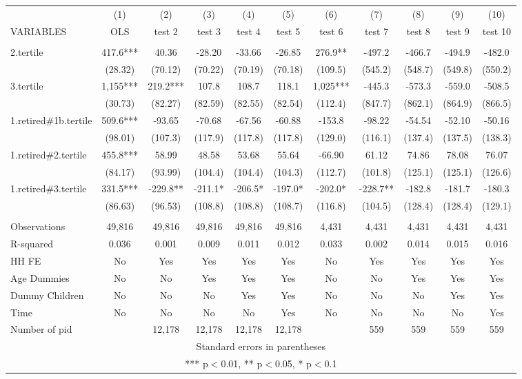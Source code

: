 \begin{tabular}{lcccccccccc} \hline
 & (1) & (2) & (3) & (4) & (5) & (6) & (7) & (8) & (9) & (10) \\
VARIABLES & OLS & test 2 & test 3 & test 4 & test 5 & test 6 & test 7 & test 8 & test 9 & test 10 \\ \hline
 &  &  &  &  &  &  &  &  &  &  \\
2.tertile & 417.6*** & 40.36 & -28.20 & -33.66 & -26.85 & 276.9** & -497.2 & -466.7 & -494.9 & -482.0 \\
 & (28.32) & (70.12) & (70.22) & (70.19) & (70.18) & (109.5) & (545.2) & (548.7) & (549.8) & (550.2) \\
3.tertile & 1,155*** & 219.2*** & 107.8 & 108.7 & 118.1 & 1,025*** & -445.3 & -573.3 & -559.0 & -508.5 \\
 & (30.73) & (82.27) & (82.59) & (82.55) & (82.54) & (112.4) & (847.7) & (862.1) & (864.9) & (866.5) \\
1.retired\#1b.tertile & 509.6*** & -93.65 & -70.68 & -67.56 & -60.88 & -153.8 & -98.22 & -54.54 & -52.10 & -50.16 \\
 & (98.01) & (107.3) & (117.9) & (117.8) & (117.8) & (129.0) & (116.1) & (137.4) & (137.5) & (138.3) \\
1.retired\#2.tertile & 455.8*** & 58.99 & 48.58 & 53.68 & 55.64 & -66.90 & 61.12 & 74.86 & 78.08 & 76.07 \\
 & (84.17) & (93.99) & (104.4) & (104.4) & (104.3) & (112.7) & (101.8) & (125.1) & (125.1) & (126.6) \\
1.retired\#3.tertile & 331.5*** & -229.8** & -211.1* & -206.5* & -197.0* & -202.0* & -228.7** & -182.8 & -181.7 & -180.3 \\
 & (86.63) & (96.53) & (108.8) & (108.8) & (108.7) & (116.8) & (104.5) & (128.4) & (128.4) & (129.1) \\
 &  &  &  &  &  &  &  &  &  &  \\
Observations & 49,816 & 49,816 & 49,816 & 49,816 & 49,816 & 4,431 & 4,431 & 4,431 & 4,431 & 4,431 \\
R-squared & 0.036 & 0.001 & 0.009 & 0.011 & 0.012 & 0.033 & 0.002 & 0.014 & 0.015 & 0.016 \\
HH FE & No & Yes & Yes & Yes & Yes & No & Yes & Yes & Yes & Yes \\
Age Dummies & No & No & Yes & Yes & Yes & No & No & Yes & Yes & Yes \\
Dummy Children & No & No & No & Yes & Yes & No & No & No & Yes & Yes \\
Time & No & No & No & No & Yes & No & No & No & No & Yes \\
 Number of pid &  & 12,178 & 12,178 & 12,178 & 12,178 &  & 559 & 559 & 559 & 559 \\ \hline
\multicolumn{11}{c}{ Standard errors in parentheses} \\
\multicolumn{11}{c}{ *** p$<$0.01, ** p$<$0.05, * p$<$0.1} \\
\end{tabular}
